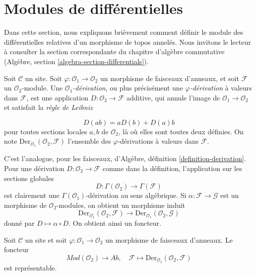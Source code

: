 \section{Modules de différentielles}

\label{section-differentials}

\noindent
Dans cette section, nous expliquons brièvement comment définir le module des
différentielles relatives d'un morphisme de topos annelés. Nous invitons le
lecteur à consulter la section correspondante du chapitre d'algèbre
commutative (Algèbre, section \ref{algebra-section-differentials}).

\begin{definition}

\label{definition-derivation}

Soit $\mathcal{C}$ un site. Soit
$\varphi : \mathcal{O}_1 \to \mathcal{O}_2$ un morphisme de faisceaux
d'anneaux, et soit $\mathcal{F}$ un $\mathcal{O}_2$-module. Une
{\it $\mathcal{O}_1$-dérivation}, ou plus précisément une
{\it $\varphi$-dérivation} à valeurs dans $\mathcal{F}$, est une application
$D : \mathcal{O}_2 \to \mathcal{F}$ additive, qui annule l'image de
$\mathcal{O}_1 \to \mathcal{O}_2$ et satisfait la {\it règle de Leibniz}

$$
D(ab) = aD(b) + D(a)b
$$
pour toutes sections locales $a, b$ de $\mathcal{O}_2$, là où elles sont
toutes deux définies. On note
$\text{Der}_{\mathcal{O}_1}(\mathcal{O}_2, \mathcal{F})$
l'ensemble des $\varphi$-dérivations à valeurs dans $\mathcal{F}$.

\end{definition}

\noindent
C'est l'analogue, pour les faisceaux, d'Algèbre, définition
\ref{definition-derivation}. Pour une dérivation
$D : \mathcal{O}_2 \to \mathcal{F}$ comme dans la définition, l'application
sur les sections globales
$$
D : \Gamma(\mathcal{O}_2) \longrightarrow \Gamma(\mathcal{F})
$$
est clairement une $\Gamma(\mathcal{O}_1)$-dérivation au sens algébrique.
Si $\alpha : \mathcal{F} \to \mathcal{G}$ est un morphisme de
$\mathcal{O}_2$-modules, on obtient un morphisme induit
$$
\text{Der}_{\mathcal{O}_1}(\mathcal{O}_2, \mathcal{F})
\longrightarrow
\text{Der}_{\mathcal{O}_1}(\mathcal{O}_2, \mathcal{G})
$$
donné par $D \mapsto \alpha \circ D$. On obtient ainsi un foncteur.

\begin{lemma}

\label{lemma-universal-module}

Soit $\mathcal{C}$ un site et soit
$\varphi : \mathcal{O}_1 \to \mathcal{O}_2$ un morphisme de faisceaux
d'anneaux. Le foncteur
$$
\textit{Mod}(\mathcal{O}_2) \longrightarrow \textit{Ab}, \quad
\mathcal{F} \longmapsto \text{Der}_{\mathcal{O}_1}(\mathcal{O}_2, \mathcal{F})
$$
est représentable.

\end{lemma}

